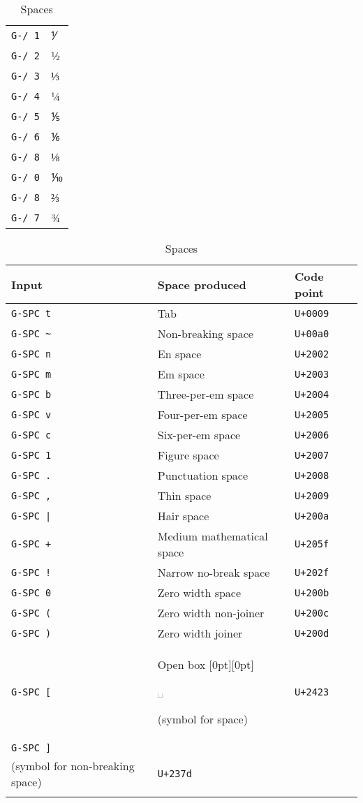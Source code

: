 \documentclass[oneside]{memoir}
\newcommand{\key}{\verb}
\newcommand{\out}[1]{\raisebox{0pt}[0pt][0pt]{\setlength{\fboxsep}{1pt}\colorbox{gray!20}{\strut{}#1}}}
\newcommand{\uni}[1]{\texttt{#1}}
\begin{document}
{{{\begin{table}
\begin{minipage}{0.25\paperwidth}
\begin{tabular}{ll}
\key|G-/ 1| & ⅟ \\
\key|G-/ 2| & ½ \\
\key|G-/ 3| & ⅓ \\
\key|G-/ 4| & ¼ \\
\key|G-/ 5| & ⅕ \\
\key|G-/ 6| & ⅙ \\
\key|G-/ 8| & ⅛ \\
\key|G-/ 0| & ⅒ \\
\key|G-/ 8| & ⅔ \\
\key|G-/ 7| & ¾ \\
\bottomrule
\end{tabular}
\end{minipage}\hfill
\begin{minipage}{0.5\paperwidth}
\caption{Spaces}
\label{tab:spaces}
\centering
\begin{tabular}{lll}
\toprule
Input     & Space produced                      & Code point \\
\midrule
\key|G-SPC t| & Tab                                 & \uni{U+0009} \\
\key|G-SPC ~| & Non-breaking space                  & \uni{U+00a0} \\
\key|G-SPC n| & En space                            & \uni{U+2002} \\
\key|G-SPC m| & Em space                            & \uni{U+2003} \\
\key|G-SPC b| & Three-per-em space                  & \uni{U+2004} \\
\key|G-SPC v| & Four-per-em space                   & \uni{U+2005} \\
\key|G-SPC c| & Six-per-em space                    & \uni{U+2006} \\
\key|G-SPC 1| & Figure space                        & \uni{U+2007} \\
\key|G-SPC .| & Punctuation space                   & \uni{U+2008} \\
\key|G-SPC ,| & Thin space                          & \uni{U+2009} \\
\key!G-SPC |! & Hair space                          & \uni{U+200a} \\
\key|G-SPC +| & Medium mathematical space           & \uni{U+205f} \\
\key|G-SPC !| & Narrow no-break space               & \uni{U+202f} \\
\key|G-SPC 0| & Zero width space                    & \uni{U+200b} \\
\key|G-SPC (| & Zero width non-joiner               & \uni{U+200c} \\
\key|G-SPC )| & Zero width joiner                   & \uni{U+200d} \\
\key|G-SPC [| & Open box \out{␣} (symbol for space) & \uni{U+2423} \\
\key|G-SPC ]|
  & \makecell{Shouldered open box \out{\tfbs{⍽}}\\\quad(symbol for non-breaking space)}
  & \uni{U+237d} \\
\bottomrule&&
\end{tabular}
\end{minipage}
\end{table}

}}}
\end{document}
